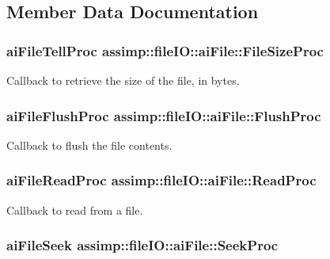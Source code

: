 \subsection{Member Data Documentation}
\hypertarget{structassimp_1_1file_i_o_1_1ai_file_a66351e0f070577889bac6d2f12f5dc3a}{
\subsubsection[{File\+Size\+Proc}]{\setlength{\rightskip}{0pt plus 5cm}ai\+File\+Tell\+Proc assimp\+::file\+I\+O\+::ai\+File\+::\+File\+Size\+Proc}}\label{structassimp_1_1file_i_o_1_1ai_file_a66351e0f070577889bac6d2f12f5dc3a}
Callback to retrieve the size of the file, in bytes. \hypertarget{structassimp_1_1file_i_o_1_1ai_file_a23f1bc417084c998e97452608e881800}{
\subsubsection[{Flush\+Proc}]{\setlength{\rightskip}{0pt plus 5cm}ai\+File\+Flush\+Proc assimp\+::file\+I\+O\+::ai\+File\+::\+Flush\+Proc}}\label{structassimp_1_1file_i_o_1_1ai_file_a23f1bc417084c998e97452608e881800}
Callback to flush the file contents. \hypertarget{structassimp_1_1file_i_o_1_1ai_file_ac3fee446c1a1050a3c48a1c52dc28af8}{
\subsubsection[{Read\+Proc}]{\setlength{\rightskip}{0pt plus 5cm}ai\+File\+Read\+Proc assimp\+::file\+I\+O\+::ai\+File\+::\+Read\+Proc}}\label{structassimp_1_1file_i_o_1_1ai_file_ac3fee446c1a1050a3c48a1c52dc28af8}
Callback to read from a file. \hypertarget{structassimp_1_1file_i_o_1_1ai_file_a974c276ec5ea1052adee9478406279c1}{
\subsubsection[{Seek\+Proc}]{\setlength{\rightskip}{0pt plus 5cm}ai\+File\+Seek assimp\+::file\+I\+O\+::ai\+File\+::\+Seek\+Proc}}\label{structassimp_1_1file_i_o_1_1ai_file_a974c276ec5ea1052adee9478406279c1}
